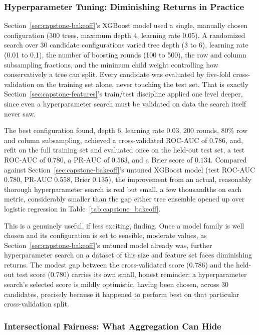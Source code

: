 \documentclass[../ai_in_finance]{subfiles}
\begin{document}
\subsubsection*{Hyperparameter Tuning: Diminishing Returns in Practice}

Section~\ref{sec:capstone-bakeoff}'s XGBoost model used a single, manually chosen configuration (300 trees, maximum depth 4, learning rate 0.05). A randomized search over 30 candidate configurations varied tree depth (3 to 6), learning rate (0.01 to 0.1), the number of boosting rounds (100 to 500), the row and column subsampling fractions, and the minimum child weight controlling how conservatively a tree can split. Every candidate was evaluated by five-fold cross-validation on the training set alone, never touching the test set. That is exactly Section~\ref{sec:capstone-features}'s train/test discipline applied one level deeper, since even a hyperparameter search must be validated on data the search itself never saw.

The best configuration found, depth 6, learning rate 0.03, 200 rounds, 80\% row and column subsampling, achieved a cross-validated ROC-AUC of $0.786$, and, refit on the full training set and evaluated once on the held-out test set, a test ROC-AUC of $0.780$, a PR-AUC of $0.563$, and a Brier score of $0.134$. Compared against Section~\ref{sec:capstone-bakeoff}'s untuned XGBoost model (test ROC-AUC $0.780$, PR-AUC $0.558$, Brier $0.135$), the improvement from an actual, reasonably thorough hyperparameter search is real but small, a few thousandths on each metric, considerably smaller than the gap either tree ensemble opened up over logistic regression in Table~\ref{tab:capstone_bakeoff}.

This is a genuinely useful, if less exciting, finding. Once a model family is well chosen and its configuration is set to sensible, moderate values, as Section~\ref{sec:capstone-bakeoff}'s untuned model already was, further hyperparameter search on a dataset of this size and feature set faces diminishing returns. The modest gap between the cross-validated score ($0.786$) and the held-out test score ($0.780$) carries its own small, honest reminder: a hyperparameter search's selected score is mildly optimistic, having been chosen, across 30 candidates, precisely because it happened to perform best on that particular cross-validation split.

\subsubsection*{Intersectional Fairness: What Aggregation Can Hide}
\end{document}
